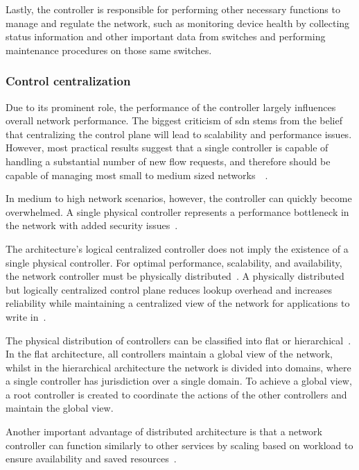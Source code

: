 Lastly, the controller is responsible for performing other necessary functions to manage and regulate the network, such as monitoring device health by collecting status information and other important data from switches and performing maintenance procedures on those same switches.

\subsubsection{Control centralization}
Due to its prominent role, the performance of the controller largely influences overall network performance. The biggest criticism of \gls{sdn} stems from the belief that centralizing the control plane will lead to scalability and performance issues. However, most practical results suggest that a single controller is capable of handling a substantial number of new flow requests, and therefore should be capable of managing most small to medium sized networks~\cite{nunes_survey_2014}~\cite{zhu_sdn_2020}.

In medium to high network scenarios, however, the controller can quickly become overwhelmed. A single physical controller represents a performance bottleneck in the network with added security issues~\cite{zhu_sdn_2020}. 

The architecture's logical centralized controller does not imply the existence of a single physical controller. For optimal performance, scalability, and availability, the network controller must be physically distributed~\cite{kreutz_software-defined_2015}. A physically distributed but logically centralized control plane reduces lookup overhead and increases reliability while maintaining a centralized view of the network for applications to write in~\cite{nunes_survey_2014}. 

The physical distribution of controllers can be classified into flat or hierarchical~\cite{zhu_sdn_2020}. In the flat architecture, all controllers maintain a global view of the network, whilst in the hierarchical architecture the network is divided into domains, where a single controller has jurisdiction over a single domain. To achieve a global view, a root controller is created to coordinate the actions of the other controllers and maintain the global view. 

Another important advantage of distributed architecture is that a network controller can function similarly to other services by scaling based on workload to ensure availability and saved resources~\cite{peterson_software-defined_2021}. 

